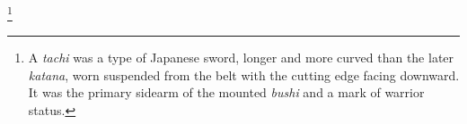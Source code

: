 \footnote{A \textit{tachi} was a type of Japanese sword, longer and more curved than the later \textit{katana}, worn suspended from the belt with the cutting edge facing downward. It was the primary sidearm of the mounted \textit{bushi} and a mark of warrior status.}